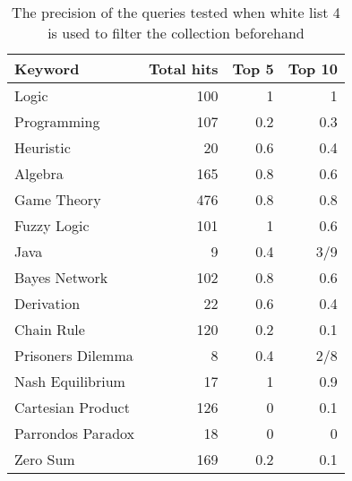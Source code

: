 \begin{table}[h!]
\centering
\begin{tabular} {|| p{15em} | r | r | r ||} 
 \hline
 Keyword & Total hits & Top 5 & Top 10 \\ [0.5ex] 
 \hline

Logic & 100 & 1 & 1 \\
Programming & 107 & 0.2 & 0.3 \\
Heuristic & 20 & 0.6 & 0.4 \\
Algebra & 165 & 0.8 & 0.6 \\
Game Theory & 476 & 0.8 & 0.8 \\
\hline
Fuzzy Logic & 101 & 1 & 0.6 \\
Java & 9 & 0.4 & 3/9 \\
Bayes Network & 102 & 0.8 & 0.6 \\
Derivation & 22 & 0.6 & 0.4 \\
\hline
Chain Rule & 120 & 0.2 & 0.1 \\
Prisoners Dilemma & 8 & 0.4 & 2/8 \\
Nash Equilibrium & 17 & 1 & 0.9 \\
Cartesian Product & 126 & 0 & 0.1 \\
Parrondos Paradox & 18 & 0 & 0 \\
Zero Sum & 169 & 0.2 & 0.1 \\

 \hline
\end{tabular}
\caption{The precision of the queries tested when white list 4 is used to filter the collection beforehand}
\label{table:p_test_list4}
\end{table}

\cleardoublepage